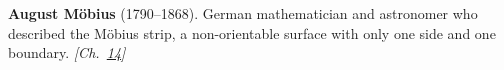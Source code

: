 \textbf{August Möbius} (1790–1868). German mathematician and astronomer who described the M\"{o}bius strip, a non-orientable surface with only one side and one boundary. \emph{[Ch.~\hyperref[ch:compacttwinparadox]{14}]}

